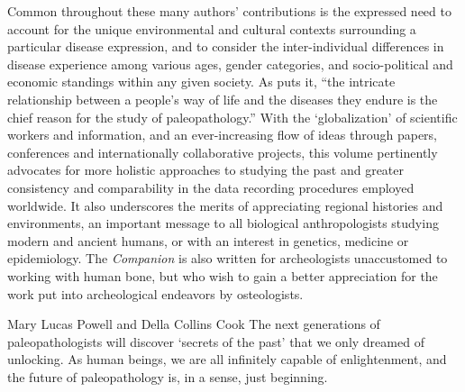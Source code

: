 \documentclass{ijsra}
\begin{document}
Common throughout these many authors’ contributions is the expressed need to account for the unique environmental and cultural contexts surrounding a particular disease expression, and to consider the inter-individual differences in disease experience among various ages, gender categories, and socio-political and economic standings within any given society.
As \textcite[18]{Wells1964} puts it, “the intricate relationship between a people’s way of life and the diseases they endure is the chief reason for the study of paleopathology.”
With the ‘globalization’ of scientific workers and information, and an ever-increasing flow of ideas through papers, conferences and internationally collaborative projects, this volume pertinently advocates for more holistic approaches to studying the past and greater consistency and comparability in the data recording procedures employed worldwide.
It also underscores the merits of appreciating regional histories and environments, an important message to all biological anthropologists studying modern and ancient humans, or with an interest in genetics, medicine or epidemiology.
The \textit{Companion} is also written for archeologists unaccustomed to working with human bone, but who wish to gain a better appreciation for the work put into archeological endeavors by osteologists.

\begin{IJSRAquote}{Mary Lucas Powell and Della Collins Cook\footnotemark}
The next generations of paleopathologists will discover ‘secrets of the past’ that we only dreamed of unlocking. As human beings, we are all infinitely capable of enlightenment, and the future of paleopathology is, in a sense, just beginning.
\end{IJSRAquote}
\IJSRAclosing%
\end{document}
